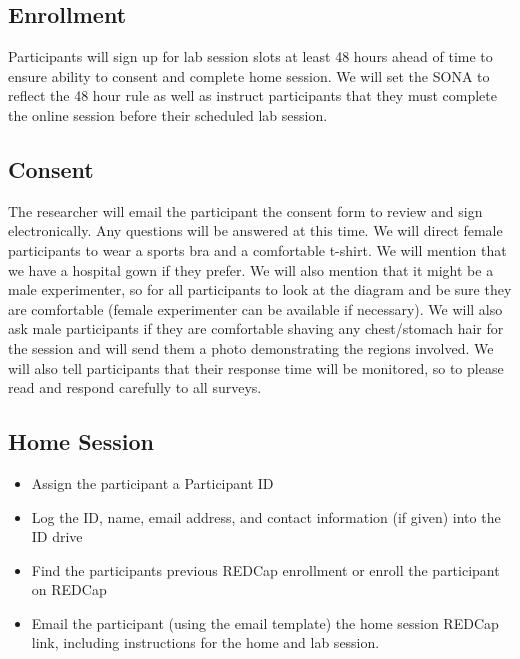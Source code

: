 \documentclass[]{book}
\providecommand{\tightlist}{%
  \setlength{\itemsep}{0pt}\setlength{\parskip}{0pt}}
\begin{document}
\hypertarget{enrollment}{%
\subsection{Enrollment}\label{enrollment}}

Participants will sign up for lab session slots at least 48 hours ahead of time to ensure ability to consent and complete home session. We will set the SONA to reflect the 48 hour rule as well as instruct participants that they must complete the online session before their scheduled lab session.

\hypertarget{consent}{%
\subsection{Consent}\label{consent}}

The researcher will email the participant the consent form to review and sign electronically. Any questions will be answered at this time. We will direct female participants to wear a sports bra and a comfortable t-shirt. We will mention that we have a hospital gown if they prefer. We will also mention that it might be a male experimenter, so for all participants to look at the diagram and be sure they are comfortable (female experimenter can be available if necessary). We will also ask male participants if they are comfortable shaving any chest/stomach hair for the session and will send them a photo demonstrating the regions involved. We will also tell participants that their response time will be monitored, so to please read and respond carefully to all surveys.

\hypertarget{home-session}{%
\subsection{Home Session}\label{home-session}}

\begin{itemize}
\tightlist
\item
  Assign the participant a Participant ID
\item
  Log the ID, name, email address, and contact information (if given) into the ID drive
\item
  Find the participants previous REDCap enrollment or enroll the participant on REDCap
\item
  Email the participant (using the email template) the home session REDCap link, including instructions for the home and lab session.
\end{itemize}
\end{document}
